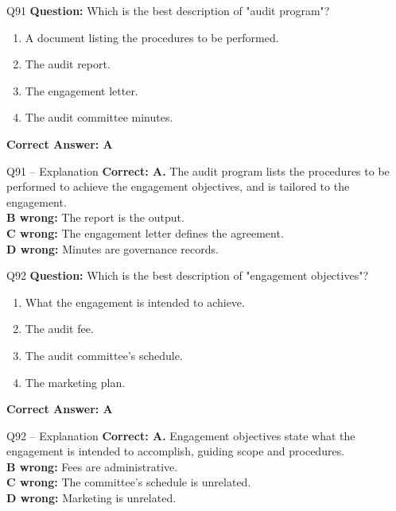 \documentclass[aspectratio=169,10pt]{beamer}
\begin{document}
	\begin{frame}[t]{Q91}
		\small
		\textbf{Question:} Which is the best description of "audit program"?
		\begin{enumerate}[label=\Alph*.,itemsep=1pt,topsep=2pt]
			\item A document listing the procedures to be performed.
			\item The audit report.
			\item The engagement letter.
			\item The audit committee minutes.
		\end{enumerate}
		\vspace{4pt}
		\textbf{Correct Answer: A}
	\end{frame}
	
	\begin{frame}[t]{Q91 -- Explanation}
		\small
		\textbf{Correct: A.} The audit program lists the procedures to be performed to achieve the engagement objectives, and is tailored to the engagement. \\[4pt]
		\textbf{B wrong:} The report is the output. \\[2pt]
		\textbf{C wrong:} The engagement letter defines the agreement. \\[2pt]
		\textbf{D wrong:} Minutes are governance records.
	\end{frame}
	
	\begin{frame}[t]{Q92}
		\small
		\textbf{Question:} Which is the best description of "engagement objectives"?
		\begin{enumerate}[label=\Alph*.,itemsep=1pt,topsep=2pt]
			\item What the engagement is intended to achieve.
			\item The audit fee.
			\item The audit committee's schedule.
			\item The marketing plan.
		\end{enumerate}
		\vspace{4pt}
		\textbf{Correct Answer: A}
	\end{frame}
	
	\begin{frame}[t]{Q92 -- Explanation}
		\small
		\textbf{Correct: A.} Engagement objectives state what the engagement is intended to accomplish, guiding scope and procedures. \\[4pt]
		\textbf{B wrong:} Fees are administrative. \\[2pt]
		\textbf{C wrong:} The committee's schedule is unrelated. \\[2pt]
		\textbf{D wrong:} Marketing is unrelated.
	\end{frame}
	
\end{document}
